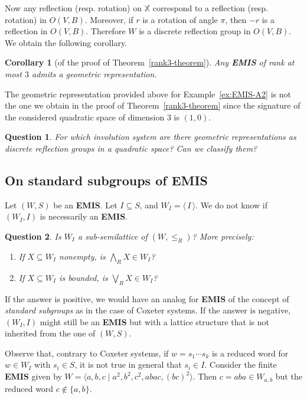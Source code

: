 \documentclass[A4paper, oneside]{amsart}
\newcommand{\mpair}[1]{\langle\, #1\,\rangle}  %
\newcommand{\X}{\mathbb{X}}
\newcommand{\EMIS}{\textnormal{\bf EMIS}\xspace}
\newtheorem{cor}[thm]{Corollary}
\newtheorem{question}{Question}
\theoremstyle{definition}
\begin{document}
Now any reflection (resp. rotation)  on $\X$ correspond to a reflection (resp. rotation)  in $O(V,B)$. Moreover, if $r$ is a rotation of angle $\pi$, then $-r$ is a reflection in $O(V,B)$. Therefore $W$ is a discrete reflection group in $O(V,B)$. We obtain  the following corollary.

\begin{cor}[of the proof of Theorem~\ref{rank3-theorem}] Any \EMIS of rank at most $3$ admits a geometric representation.
\end{cor}

The geometric representation provided above for Example~\ref{ex:EMIS-A2} is not the one we obtain in the proof of Theorem~\ref{rank3-theorem} since the signature of the considered quadratic space of dimension $3$ is $(1,0)$. 

\begin{question}\label{qu:6} For which involution system are there geometric representations as discrete reflection groups in a quadratic space? Can we classify them?
\end{question}



\subsection{On standard subgroups of \EMIS}  Let $(W,S)$ be an \EMIS. Let $I\subseteq S$, and $W_I=\mpair{I}$. We do not know if $(W_I,I)$ is necessarily an \EMIS.  

\begin{question} \label{qu: parabolic subgroup} Is $W_I$ a sub-semilattice of $(W,\leq_R)$? More precisely: 
	\begin{enumerate}
		\item If $X\subseteq W_I$ nonempty, is $\bigwedge_R X\in W_I$?
		\item If $X\subseteq W_I$ is bounded, is $\bigvee_R X\in W_I$?
	\end{enumerate}
\end{question}

If the answer is positive, we would have an analog for \EMIS of the concept of {\em standard subgroups} as in the case of Coxeter systems. If the answer is negative, $(W_I,I)$ might still be an \EMIS but with a lattice structure that is not inherited from the one of $(W,S)$.

Observe that, contrary to Coxeter systems, if $w=s_1\cdots s_k$ is a reduced word for $w \in W_I$ with $s_i\in S$, it is not true in general that $s_i\in I$. Consider the finite \EMIS given by $W=\langle a,b,c \mid a^2,b^2,c^2,abac,(bc)^2 \rangle$. Then $c=aba\in W_{a,b}$ but the reduced word $c\notin \{a,b\}$. 
\end{document}
